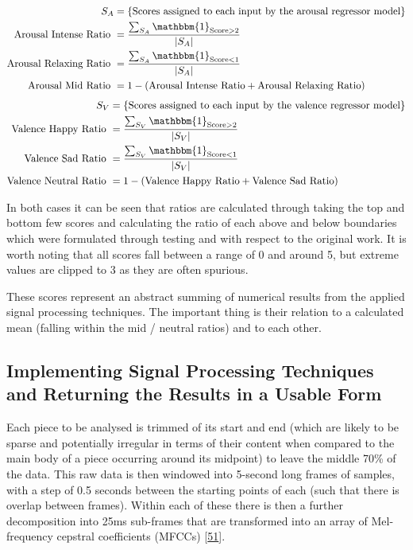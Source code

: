 \documentclass[12pt,]{article}
\begin{document}
\[\begin{aligned}
S_A &= \{\text{Scores assigned to each input by the arousal regressor model}\} \\
\text{Arousal Intense Ratio } &= \frac{\sum_{S_A} \mathbbm{1}_{\text{Score}> 2}}{|S_A|} \\
\text{Arousal Relaxing Ratio } &= \frac{\sum_{S_A} \mathbbm{1}_{\text{Score}< 1}}{|S_A|} \\
\text{Arousal Mid Ratio } &= 1 - (\text{Arousal Intense Ratio} + \text{Arousal Relaxing Ratio})
\end{aligned}\] \[\begin{aligned}
S_V &= \{\text{Scores assigned to each input by the valence regressor model}\} \\
\text{Valence Happy Ratio } &= \frac{\sum_{S_V} \mathbbm{1}_{\text{Score}> 2}}{|S_V|} \\
\text{Valence Sad Ratio } &= \frac{\sum_{S_V} \mathbbm{1}_{\text{Score}< 1}}{|S_V|} \\
\text{Valence Neutral Ratio } &= 1 - (\text{Valence Happy Ratio} + \text{Valence Sad Ratio}) \\
\end{aligned}\]

In both cases it can be seen that ratios are calculated through taking
the top and bottom few scores and calculating the ratio of each above
and below boundaries which were formulated through testing and with
respect to the original work. It is worth noting that all scores fall
between a range of 0 and around 5, but extreme values are clipped to 3
as they are often spurious.

These scores represent an abstract summing of numerical results from the
applied signal processing techniques. The important thing is their
relation to a calculated mean (falling within the mid / neutral ratios)
and to each other.

\hypertarget{implementing-signal-processing-techniques-and-returning-the-results-in-a-usable-form}{%
\subsection{Implementing Signal Processing Techniques and Returning the
Results in a Usable
Form}\label{implementing-signal-processing-techniques-and-returning-the-results-in-a-usable-form}}

Each piece to be analysed is trimmed of its start and end (which are
likely to be sparse and potentially irregular in terms of their content
when compared to the main body of a piece occurring around its midpoint)
to leave the middle 70\% of the data. This raw data is then windowed
into 5-second long frames of samples, with a step of 0.5 seconds between
the starting points of each (such that there is overlap between frames).
Within each of these there is then a further decomposition into 25ms
sub-frames that are transformed into an array of Mel-frequency cepstral
coefficients (MFCCs) {[}\protect\hyperlink{ref-logan2000mel}{51}{]}.
\end{document}
